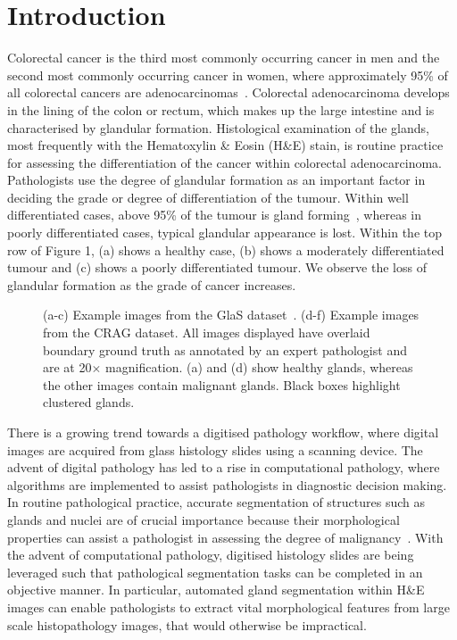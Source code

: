 \documentclass[3p]{elsarticle}
\begin{document}
\section{Introduction}
Colorectal cancer is the third most commonly occurring cancer in men and the second most commonly occurring cancer in women, where approximately 95\% of all colorectal cancers are adenocarcinomas~\citep{fleming2012colorectal}. Colorectal adenocarcinoma develops in the lining of the colon or rectum, which makes up the large intestine and is characterised by glandular formation. Histological examination of the glands, most frequently with the Hematoxylin \& Eosin (H\&E) stain, is routine practice for assessing the differentiation of the cancer within colorectal adenocarcinoma. Pathologists use the degree of glandular formation as an important factor in deciding the grade or degree of differentiation of the tumour. Within well differentiated cases, above 95\% of the tumour is gland forming~\citep{fleming2012colorectal}, whereas in poorly differentiated cases, typical glandular appearance is lost. Within the top row of Figure 1, (a) shows a healthy case, (b) shows a moderately differentiated tumour and (c) shows a poorly differentiated tumour. We observe the loss of glandular formation as the grade of cancer increases. 



\begin{figure}[!t]
\captionsetup[subfigure]{labelformat=empty}
\centering
{}
\caption{(a-c) Example images from the GlaS dataset~\citep{sirinukunwattana2017gland}. (d-f) Example images from the CRAG dataset. All images displayed have overlaid boundary ground truth as annotated by an expert pathologist and are at 20$\times$ magnification. (a) and (d) show healthy glands, whereas the other images contain malignant glands. Black boxes highlight clustered glands.
}
\label{fig:detection}
\end{figure}

There is a growing trend towards a digitised pathology workflow, where digital images are acquired from glass histology slides using a scanning device. The advent of digital pathology has led to a rise in computational pathology, where algorithms are implemented to assist pathologists in diagnostic decision making. In routine pathological practice, accurate segmentation of structures such as glands and nuclei are of crucial importance because their morphological properties can assist a pathologist in assessing the degree of malignancy~\citep{compton2000updated,hamilton2000pathology,washington2009protocol}. With the advent of computational pathology, digitised histology slides are being leveraged such that pathological segmentation tasks can be completed in an objective manner. In particular, automated gland segmentation within H\&E images can enable pathologists to extract vital morphological features from large scale histopathology images, that would otherwise be impractical.
\end{document}
